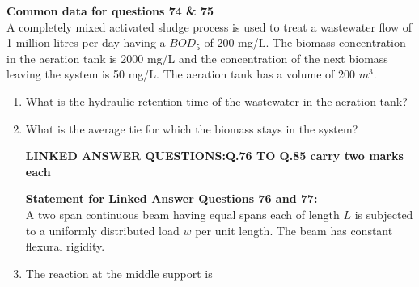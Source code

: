 \documentclass[journal]{IEEEtran}
\begin{document}
\textbf{Common data for questions 74 \& 75} \\
A completely mixed activated sludge process is used to treat a wastewater flow of 1 million litres per day  having a $BOD_5$ of 200 mg/L. The biomass concentration in the aeration tank is 2000 mg/L and the concentration of the next biomass leaving the system is 50 mg/L. The aeration tank has a volume of 200 $m^3$.
\begin{enumerate}[start=74]
\item %
What is the hydraulic retention time of the wastewater in the aeration tank?
\begin{enumerate}
\end{enumerate}

\item %
What is the average tie for which the biomass stays in the system?
\begin{enumerate}
\end{enumerate}

\begin{center}
    \textbf{LINKED ANSWER QUESTIONS:Q.76 TO Q.85 carry two marks each}
\end{center} 
\textbf{Statement for Linked Answer Questions 76 and 77:}\\
A two span continuous beam having equal spans each of length $L$ is subjected  to a uniformly distributed load $w$ per unit length. The beam has constant flexural rigidity.
\item %
The reaction at the middle support is 
\begin{enumerate}
\end{enumerate}


\end{enumerate}
\end{document}
